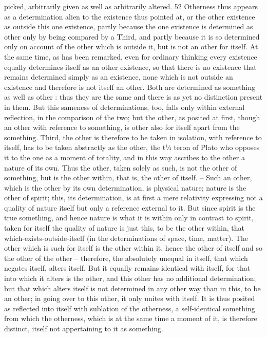 picked, arbitrarily given as well as arbitrarily altered. 52
Otherness thus appears as a determination alien to the existence thus
pointed at, or the other existence as outside this one existence, partly
because the one existence is determined as other only by being compared
by a Third, and partly because it is so determined only on account of the
other which is outside it, but is not an other for itself. At the same time,
as has been remarked, even for ordinary thinking every existence equally
determines itself as an other existence, so that there is no existence that
remains determined simply as an existence, none which is not outside an
existence and therefore is not itself an other.
Both are determined as something as well as other : thus they are the
same and there is as yet no distinction present in them. But this sameness of
determinations, too, falls only within external reflection, in the comparison
of the two; but the other, as posited at first, though an other with reference
to something, is other also for itself apart from the something.
Third, the other is therefore to be taken in isolation, with reference to
itself, has to be taken abstractly as the other, the t¼ teron of Plato who
opposes it to the one as a moment of totality, and in this way ascribes
to the other a nature of its own. Thus the other, taken solely as such, is
not the other of something, but is the other within, that is, the other of
itself. – Such an other, which is the other by its own determination, is
physical nature; nature is the other of spirit; this, its determination, is at first
a mere relativity expressing not a quality of nature itself but only a reference
external to it. But since spirit is the true something, and hence nature is
what it is within only in contrast to spirit, taken for itself the quality of
nature is just this, to be the other within, that which-exists-outside-itself (in
the determinations of space, time, matter).
The other which is such for itself is the other within it, hence the other
of itself and so the other of the other – therefore, the absolutely unequal in
itself, that which negates itself, alters itself. But it equally remains identical
with itself, for that into which it alters is the other, and this other has no
additional determination; but that which alters itself is not determined in
any other way than in this, to be an other; in going over to this other, it only
unites with itself. It is thus posited as reflected into itself with sublation of
the otherness, a self-identical something from which the otherness, which is
at the same time a moment of it, is therefore distinct, itself not appertaining
to it as something.

